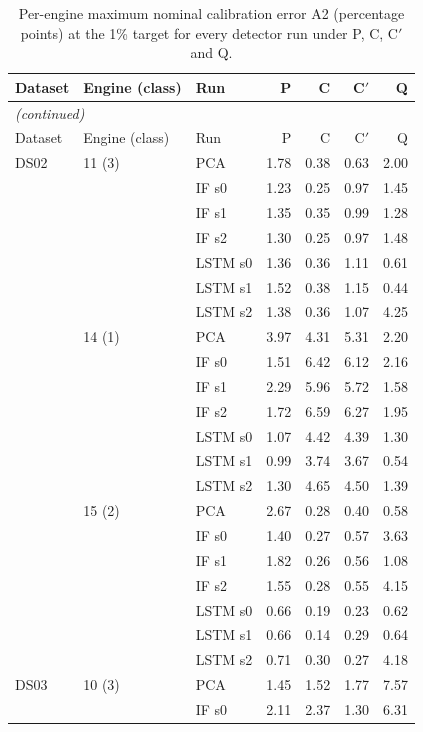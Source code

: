 \begin{scriptsize}
\begin{longtable}{lllrrrr}
\caption{Per-engine maximum nominal calibration error A2 (percentage points) at the 1\% target for every detector run under P, C, C$'$ and Q.}\label{tab:s11_per_engine}\\
\toprule
Dataset & Engine (class) & Run & P & C & C$'$ & Q \\
\midrule
\endfirsthead
\multicolumn{7}{l}{\emph{(continued)}}\\
\toprule
Dataset & Engine (class) & Run & P & C & C$'$ & Q \\
\midrule
\endhead
\bottomrule
\endfoot
DS02 & 11 (3) & PCA & 1.78 & 0.38 & 0.63 & 2.00 \\
 &  & IF s0 & 1.23 & 0.25 & 0.97 & 1.45 \\
 &  & IF s1 & 1.35 & 0.35 & 0.99 & 1.28 \\
 &  & IF s2 & 1.30 & 0.25 & 0.97 & 1.48 \\
 &  & LSTM s0 & 1.36 & 0.36 & 1.11 & 0.61 \\
 &  & LSTM s1 & 1.52 & 0.38 & 1.15 & 0.44 \\
 &  & LSTM s2 & 1.38 & 0.36 & 1.07 & 4.25 \\
 & 14 (1) & PCA & 3.97 & 4.31 & 5.31 & 2.20 \\
 &  & IF s0 & 1.51 & 6.42 & 6.12 & 2.16 \\
 &  & IF s1 & 2.29 & 5.96 & 5.72 & 1.58 \\
 &  & IF s2 & 1.72 & 6.59 & 6.27 & 1.95 \\
 &  & LSTM s0 & 1.07 & 4.42 & 4.39 & 1.30 \\
 &  & LSTM s1 & 0.99 & 3.74 & 3.67 & 0.54 \\
 &  & LSTM s2 & 1.30 & 4.65 & 4.50 & 1.39 \\
 & 15 (2) & PCA & 2.67 & 0.28 & 0.40 & 0.58 \\
 &  & IF s0 & 1.40 & 0.27 & 0.57 & 3.63 \\
 &  & IF s1 & 1.82 & 0.26 & 0.56 & 1.08 \\
 &  & IF s2 & 1.55 & 0.28 & 0.55 & 4.15 \\
 &  & LSTM s0 & 0.66 & 0.19 & 0.23 & 0.62 \\
 &  & LSTM s1 & 0.66 & 0.14 & 0.29 & 0.64 \\
 &  & LSTM s2 & 0.71 & 0.30 & 0.27 & 4.18 \\
\midrule
DS03 & 10 (3) & PCA & 1.45 & 1.52 & 1.77 & 7.57 \\
 &  & IF s0 & 2.11 & 2.37 & 1.30 & 6.31 \\

\end{longtable}
\end{scriptsize}
